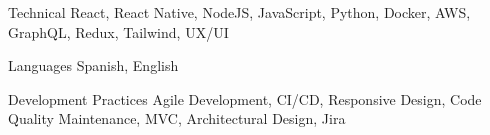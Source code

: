 \begin{cvskills}

  \cvskill
  {Technical} %
  {React, React Native, NodeJS, JavaScript, Python, Docker, AWS, GraphQL, Redux, Tailwind, UX/UI} %

  \cvskill
  {Languages} %
  {Spanish, English} %

  \cvskill
  {Development Practices} %
  {Agile Development, CI/CD, Responsive Design, Code Quality Maintenance, MVC, Architectural Design, Jira} %

\end{cvskills}
